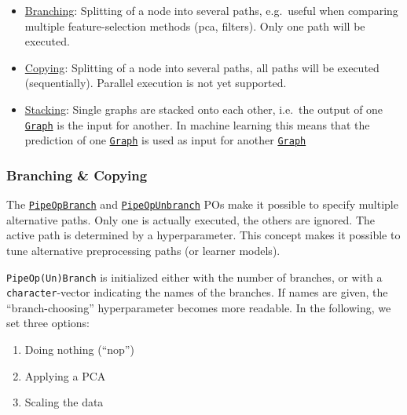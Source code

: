 \documentclass[]{article}
\providecommand{\tightlist}{%
  \setlength{\itemsep}{0pt}\setlength{\parskip}{0pt}}
\begin{document}
\begin{itemize}
\tightlist
\item
  \protect\hyperlink{pipe-model-ensembles-branching}{Branching}:
  Splitting of a node into several paths, e.g.~useful when comparing multiple feature-selection methods (pca, filters).
  Only one path will be executed.
\item
  \protect\hyperlink{pipe-model-ensembles-copying}{Copying}:
  Splitting of a node into several paths, all paths will be executed (sequentially).
  Parallel execution is not yet supported.
\item
  \protect\hyperlink{pipe-model-ensembles-stacking}{Stacking}:
  Single graphs are stacked onto each other, i.e.~the output of one \href{https://mlr3pipelines.mlr-org.com/reference/Graph.html}{\texttt{Graph}} is the input for another.
  In machine learning this means that the prediction of one \href{https://mlr3pipelines.mlr-org.com/reference/Graph.html}{\texttt{Graph}} is used as input for another \href{https://mlr3pipelines.mlr-org.com/reference/Graph.html}{\texttt{Graph}}
\end{itemize}

\hypertarget{pipe-model-ensembles-branching-copying}{%
\subsubsection{Branching \& Copying}\label{pipe-model-ensembles-branching-copying}}

The \href{https://mlr3pipelines.mlr-org.com/reference/mlr_pipeops_branch.html}{\texttt{PipeOpBranch}} and \href{https://mlr3pipelines.mlr-org.com/reference/mlr_pipeops_unbranch.html}{\texttt{PipeOpUnbranch}} POs make it possible to specify multiple alternative paths.
Only one is actually executed, the others are ignored.
The active path is determined by a hyperparameter.
This concept makes it possible to tune alternative preprocessing paths (or learner models).

\texttt{PipeOp(Un)Branch} is initialized either with the number of branches, or with a \texttt{character}-vector indicating the names of the branches.
If names are given, the ``branch-choosing'' hyperparameter becomes more readable.
In the following, we set three options:

\begin{enumerate}
\def\labelenumi{\arabic{enumi}.}
\tightlist
\item
  Doing nothing (``nop'')
\item
  Applying a PCA
\item
  Scaling the data
\end{enumerate}
\end{document}
